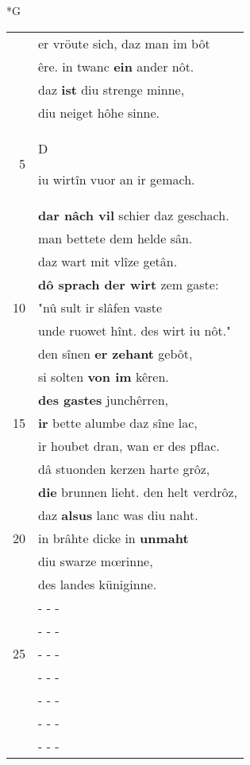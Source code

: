 \documentclass[8pt,a4paper,notitlepage]{article}
\begin{document}
\begin{table}[ht]
\begin{minipage}[t]{0.5\linewidth}
\small
\begin{center}*G
\end{center}
\begin{tabular}{rl}
 & er vröute sich, daz man im bôt\\ 
 & êre. in twanc \textbf{ein} ander nôt.\\ 
 & daz \textbf{ist} diu strenge minne,\\ 
 & diu neiget hôhe sinne.\\ 
5 & \begin{large}D\end{large}iu wirtîn vuor an ir gemach.\\ 
 & \textbf{dar nâch vil} schier daz geschach.\\ 
 & man bettete dem helde sân.\\ 
 & daz wart mit vlîze getân.\\ 
 & \textbf{dô sprach der wirt} zem gaste:\\ 
10 & "nû sult ir slâfen vaste\\ 
 & unde ruowet hînt. des wirt iu nôt."\\ 
 & den sînen \textbf{er zehant} gebôt,\\ 
 & si solten \textbf{von im} kêren.\\ 
 & \textbf{des gastes} junchêrren,\\ 
15 & \textbf{ir} bette alumbe daz sîne lac,\\ 
 & ir houbet dran, wan er des pflac.\\ 
 & dâ stuonden kerzen harte grôz,\\ 
 & \textbf{die} brunnen lieht. den helt verdrôz,\\ 
 & daz \textbf{alsus} lanc was diu naht.\\ 
20 & in brâhte dicke in \textbf{unmaht}\\ 
 & diu swarze mœrinne,\\ 
 & des landes küniginne.\\ 
 & \multicolumn{1}{l}{ - - - }\\ 
 & \multicolumn{1}{l}{ - - - }\\ 
25 & \multicolumn{1}{l}{ - - - }\\ 
 & \multicolumn{1}{l}{ - - - }\\ 
 & \multicolumn{1}{l}{ - - - }\\ 
 & \multicolumn{1}{l}{ - - - }\\ 
 & \multicolumn{1}{l}{ - - - }\\ 

\end{tabular}
\end{minipage}
\end{table}
\end{document}
